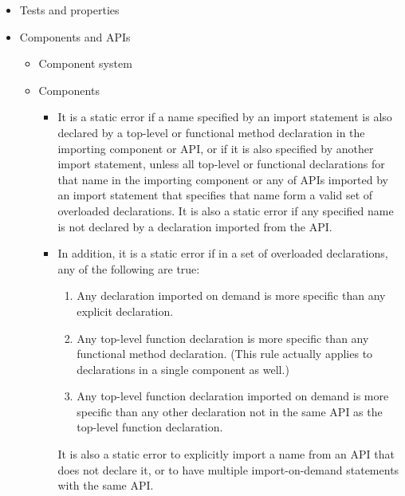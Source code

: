 \begin{itemize}
\item Tests and properties

\item Components and APIs
  \begin{itemize}

\item Component system

\item %
 Components
 \begin{itemize}
\item
It is a static error if
a name specified by an import %
statement
is also declared by a top-level or functional method declaration
in the importing component or API,
or if it is also specified by another import %
statement,
unless all top-level or functional declarations for that name
in the importing component or any of APIs
imported by an import %
statement that specifies that name
form a valid set of overloaded declarations.
It is also a static error if any specified name
is not declared by a declaration imported from the API.
\item
In addition, it is a static error if in a set of overloaded declarations,
any of the following are true:
\begin{enumerate}
\item Any declaration imported on demand is more specific than any explicit declaration.
\item Any top-level function declaration is more specific than any functional method declaration.
(This rule actually applies to declarations in a single component as well.)
\item
Any top-level function declaration imported on demand is more specific than any other declaration not in the same API as the top-level function declaration.
\end{enumerate}
It is also a static error to explicitly import a name from an API
that does not declare it, or to have multiple import-on-demand statements
with the same API.

 \end{itemize}


\end{itemize}
\end{itemize}
